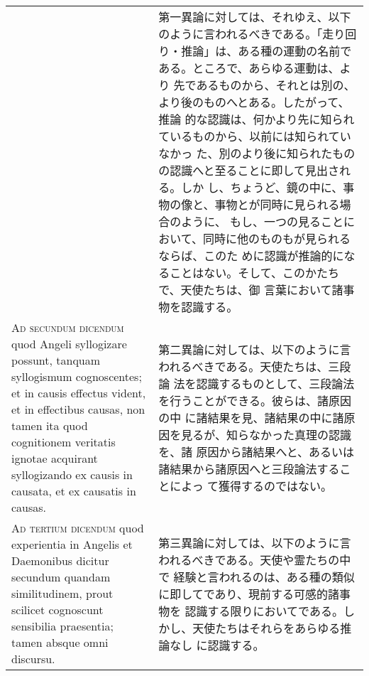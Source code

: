 \documentclass[10pt]{jsarticle} %
\begin{document}
\begin{longtable}{p{21em}p{21em}}
&

第一異論に対しては、それゆえ、以下のように言われるべきである。「走り回
り・推論」は、ある種の運動の名前である。ところで、あらゆる運動は、より
先であるものから、それとは別の、より後のものへとある。したがって、推論
的な認識は、何かより先に知られているものから、以前には知られていなかっ
た、別のより後に知られたものの認識へと至ることに即して見出される。しか
し、ちょうど、鏡の中に、事物の像と、事物とが同時に見られる場合のように、
もし、一つの見ることにおいて、同時に他のものもが見られるならば、このた
めに認識が推論的になることはない。そして、このかたちで、天使たちは、御
言葉において諸事物を認識する。



\\



{\scshape Ad secundum dicendum} quod Angeli syllogizare
possunt, tanquam syllogismum cognoscentes; et in causis effectus
vident, et in effectibus causas, non tamen ita quod cognitionem
veritatis ignotae acquirant syllogizando ex causis in causata, et ex
causatis in causas.


&

第二異論に対しては、以下のように言われるべきである。天使たちは、三段論
法を認識するものとして、三段論法を行うことができる。彼らは、諸原因の中
に諸結果を見、諸結果の中に諸原因を見るが、知らなかった真理の認識を、諸
原因から諸結果へと、あるいは諸結果から諸原因へと三段論法することによっ
て獲得するのではない。

\\



{\scshape Ad tertium dicendum} quod experientia in
Angelis et Daemonibus dicitur secundum quandam similitudinem, prout
scilicet cognoscunt sensibilia praesentia; tamen absque omni discursu.


&

第三異論に対しては、以下のように言われるべきである。天使や霊たちの中で
経験と言われるのは、ある種の類似に即してであり、現前する可感的諸事物を
認識する限りにおいてである。しかし、天使たちはそれらをあらゆる推論なし
に認識する。


\end{longtable}
\end{document}
